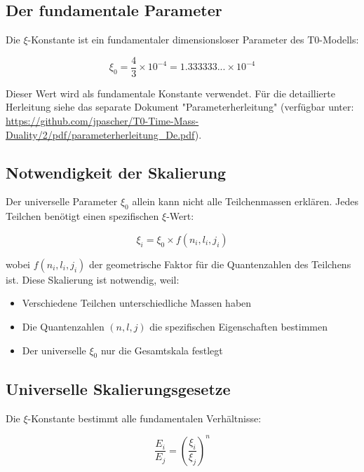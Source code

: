 \documentclass[12pt,a4paper]{report}
\begin{document}
\subsection{Der fundamentale Parameter}

Die $\xi$-Konstante ist ein fundamentaler dimensionsloser Parameter des T0-Modells:

\begin{equation}
	\boxed{\xi_0 = \frac{4}{3} \times 10^{-4} = 1.333333... \times 10^{-4}}
\end{equation}


	Dieser Wert wird als fundamentale Konstante verwendet. Für die detaillierte Herleitung 
	siehe das separate Dokument "Parameterherleitung" 
	(verfügbar unter: \url{https://github.com/jpascher/T0-Time-Mass-Duality/2/pdf/parameterherleitung_De.pdf}).


\subsection{Notwendigkeit der Skalierung}

Der universelle Parameter $\xi_0$ allein kann nicht alle Teilchenmassen erklären. Jedes Teilchen benötigt einen spezifischen $\xi$-Wert:

\begin{equation}
	\xi_i = \xi_0 \times f(n_i, l_i, j_i)
\end{equation}

wobei $f(n_i, l_i, j_i)$ der geometrische Faktor für die Quantenzahlen des Teilchens ist. Diese Skalierung ist notwendig, weil:

\begin{itemize}
	\item Verschiedene Teilchen unterschiedliche Massen haben
	\item Die Quantenzahlen $(n, l, j)$ die spezifischen Eigenschaften bestimmen
	\item Der universelle $\xi_0$ nur die Gesamtskala festlegt
\end{itemize}

\subsection{Universelle Skalierungsgesetze}

Die $\xi$-Konstante bestimmt alle fundamentalen Verhältnisse:

\begin{equation}
	\frac{E_i}{E_j} = \left(\frac{\xi_i}{\xi_j}\right)^n
\end{equation}
\end{document}
